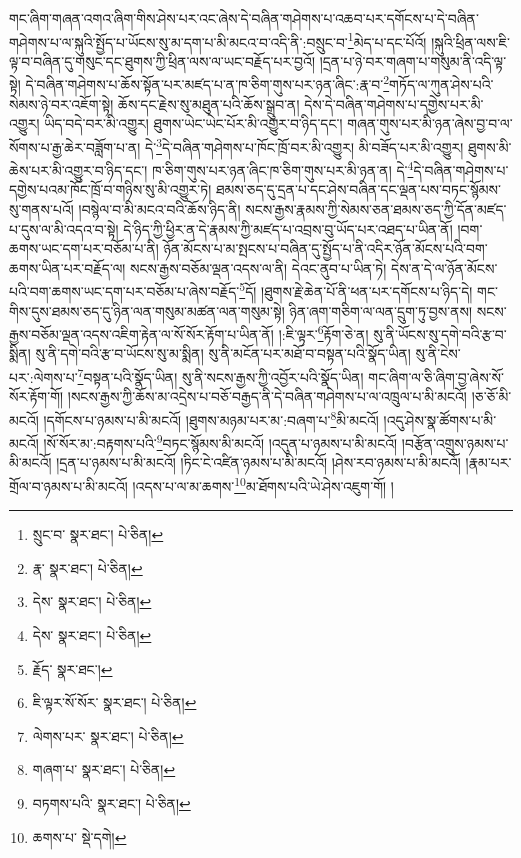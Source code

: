 གང་ཞིག་གཞན་འགའ་ཞིག་གིས་ཤེས་པར་འང་ཞེས་དེ་བཞིན་གཤེགས་པ་འཆབ་པར་དགོངས་པ་དེ་བཞིན་གཤེགས་པ་ལ་སྐུའི་སྤྱོད་པ་ཡོངས་སུ་མ་དག་པ་མི་མངའ་བ་འདི་ནི་:བསྲུང་བ་\footnote{སྲུང་བ་  སྣར་ཐང་།  པེ་ཅིན། }མེད་པ་དང་པོའོ། །སྐུའི་ཕྲིན་ལས་ཇི་ལྟ་བ་བཞིན་དུ་གསུང་དང་ཐུགས་ཀྱི་ཕྲིན་ལས་ལ་ཡང་བརྗོད་པར་བྱའོ། །དྲན་པ་ཉེ་བར་གཞག་པ་གསུམ་ནི་འདི་ལྟ་སྟེ། དེ་བཞིན་གཤེགས་པ་ཆོས་སྟོན་པར་མཛད་པ་ན་ཁ་ཅིག་གུས་པར་ཉན་ཞིང་:རྣ་བ་\footnote{རྣ་  སྣར་ཐང་།  པེ་ཅིན། }གཏོད་ལ་ཀུན་ཤེས་པའི་སེམས་ཉེ་བར་འཇོག་སྟེ། ཆོས་དང་རྗེས་སུ་མཐུན་པའི་ཆོས་སྒྲུབ་ན། དེས་དེ་བཞིན་གཤེགས་པ་དགྱེས་པར་མི་འགྱུར། ཡིད་བདེ་བར་མི་འགྱུར། ཐུགས་ཡེང་ཡེང་པོར་མི་འགྱུར་བ་ཉིད་དང་། གཞན་གུས་པར་མི་ཉན་ཞེས་བྱ་བ་ལ་སོགས་པ་རྒྱ་ཆེར་བཟློག་པ་ན། དེ་\footnote{དེས་  སྣར་ཐང་།  པེ་ཅིན། }དེ་བཞིན་གཤེགས་པ་ཁོང་ཁྲོ་བར་མི་འགྱུར། མི་བཟོད་པར་མི་འགྱུར། ཐུགས་མི་ཆེས་པར་མི་འགྱུར་བ་ཉིད་དང་། ཁ་ཅིག་གུས་པར་ཉན་ཞིང་ཁ་ཅིག་གུས་པར་མི་ཉན་ན། དེ་\footnote{དེས་  སྣར་ཐང་།  པེ་ཅིན། }དེ་བཞིན་གཤེགས་པ་དགྱེས་པའམ་ཁོང་ཁྲོ་བ་གཉིས་སུ་མི་འགྱུར་ཏེ། ཐམས་ཅད་དུ་དྲན་པ་དང་ཤེས་བཞིན་དང་ལྡན་པས་བཏང་སྙོམས་སུ་གནས་པའོ། །བསྙེལ་བ་མི་མངའ་བའི་ཆོས་ཉིད་ནི། སངས་རྒྱས་རྣམས་ཀྱི་སེམས་ཅན་ཐམས་ཅད་ཀྱི་དོན་མཛད་པ་དུས་ལ་མི་འདའ་བ་སྟེ། དེ་ཉིད་ཀྱི་ཕྱིར་ན་དེ་རྣམས་ཀྱི་མཛད་པ་འབྲས་བུ་ཡོད་པར་འཐད་པ་ཡིན་ནོ། །བག་ཆགས་ཡང་དག་པར་བཅོམ་པ་ནི། ཉོན་མོངས་པ་མ་སྤངས་པ་བཞིན་དུ་སྤྱོད་པ་ནི་འདིར་ཉོན་མོངས་པའི་བག་ཆགས་ཡིན་པར་བརྗོད་ལ། སངས་རྒྱས་བཅོམ་ལྡན་འདས་ལ་ནི། དེའང་ནུབ་པ་ཡིན་ཏེ། དེས་ན་དེ་ལ་ཉོན་མོངས་པའི་བག་ཆགས་ཡང་དག་པར་བཅོམ་པ་ཞེས་བརྗོད་\footnote{རྗོད་  སྣར་ཐང་། }དོ། །ཐུགས་རྗེ་ཆེན་པོ་ནི་ཕན་པར་དགོངས་པ་ཉིད་དེ། གང་གིས་དུས་ཐམས་ཅད་དུ་ཉིན་ལན་གསུམ་མཚན་ལན་གསུམ་སྟེ། ཉིན་ཞག་གཅིག་ལ་ལན་དྲུག་ཏུ་བྱས་ནས། སངས་རྒྱས་བཅོམ་ལྡན་འདས་འཇིག་རྟེན་ལ་སོ་སོར་རྟོག་པ་ཡིན་ནོ། །:ཇི་ལྟར་\footnote{ཇི་ལྟར་སོ་སོར་  སྣར་ཐང་།  པེ་ཅིན། }རྟོག་ཅེ་ན། སུ་ནི་ཡོངས་སུ་དགེ་བའི་རྩ་བ་སྨིན། སུ་ནི་དགེ་བའི་རྩ་བ་ཡོངས་སུ་མ་སྨིན། སུ་ནི་མངོན་པར་མཐོ་བ་བསྟན་པའི་སྣོད་ཡིན། སུ་ནི་ངེས་པར་:ལེགས་པ་\footnote{ལེགས་པར་  སྣར་ཐང་།  པེ་ཅིན། }བསྟན་པའི་སྣོད་ཡིན། སུ་ནི་སངས་རྒྱས་ཀྱི་འབྱོར་པའི་སྣོད་ཡིན། གང་ཞིག་ལ་ཅི་ཞིག་བྱ་ཞེས་སོ་སོར་རྟོག་གོ། །སངས་རྒྱས་ཀྱི་ཆོས་མ་འདྲེས་པ་བཅོ་བརྒྱད་ནི་དེ་བཞིན་གཤེགས་པ་ལ་འཁྲུལ་པ་མི་མངའོ། །ཅ་ཅོ་མི་མངའོ། །དགོངས་པ་ཉམས་པ་མི་མངའོ། །ཐུགས་མཉམ་པར་མ་:བཞག་པ་\footnote{གཞག་པ་  སྣར་ཐང་།  པེ་ཅིན། }མི་མངའོ། །འདུ་ཤེས་སྣ་ཚོགས་པ་མི་མངའོ། །སོ་སོར་མ་:བརྟགས་པའི་\footnote{བཏགས་པའི་  སྣར་ཐང་།  པེ་ཅིན། }བཏང་སྙོམས་མི་མངའོ། །འདུན་པ་ཉམས་པ་མི་མངའོ། །བརྩོན་འགྲུས་ཉམས་པ་མི་མངའོ། །དྲན་པ་ཉམས་པ་མི་མངའོ། །ཏིང་ངེ་འཛིན་ཉམས་པ་མི་མངའོ། །ཤེས་རབ་ཉམས་པ་མི་མངའོ། །རྣམ་པར་གྲོལ་བ་ཉམས་པ་མི་མངའོ། །འདས་པ་ལ་མ་ཆགས་\footnote{ཆགས་པ་  སྡེ་དགེ། }མ་ཐོགས་པའི་ཡེ་ཤེས་འཇུག་གོ། །
